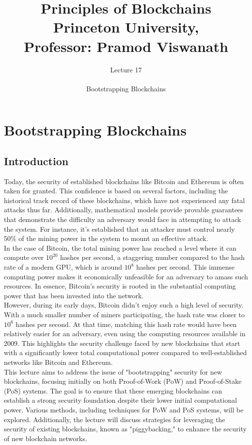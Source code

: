 \documentclass{report}
\title{\Huge{Principles of Blockchains \\ Princeton University,\\
		Professor: Pramod Viswanath}}
\author{\huge{Lecture 17} \\\\ Bootstrapping Blockchains}
\begin{document}
\maketitle
\newpage%
\tableofcontents
\pagebreak
  
\chapter{Bootstrapping Blockchains}
\section{Introduction}
Today, the security of established blockchains like Bitcoin and Ethereum is often taken for granted. This confidence is based on several factors, including the historical track record of these blockchains, which have not experienced any fatal attacks thus far. Additionally, mathematical models provide provable guarantees that demonstrate the difficulty an adversary would face in attempting to attack the system. For instance, it's established that an attacker must control nearly 50\% of the mining power in the system to mount an effective attack. \\
In the case of Bitcoin, the total mining power has reached a level where it can compute over $10^{20}$ hashes per second, a staggering number compared to the hash rate of a modern GPU, which is around $10^{8}$ hashes per second. This immense computing power makes it economically unfeasible for an adversary to amass such resources. In essence, Bitcoin's security is rooted in the substantial computing power that has been invested into the network.\\
However, during its early days, Bitcoin didn't enjoy such a high level of security. With a much smaller number of miners participating, the hash rate was closer to $10^{6}$ hashes per second. At that time, matching this hash rate would have been relatively easier for an adversary, even using the computing resources available in 2009. This highlights the security challenge faced by new blockchains that start with a significantly lower total computational power compared to well-established networks like Bitcoin and Ethereum.\\
This lecture aims to address the issue of "bootstrapping" security for new blockchains, focusing initially on both Proof-of-Work (PoW) and Proof-of-Stake (PoS) systems. The goal is to ensure that these emerging blockchains can establish a strong security foundation despite their lower initial computational power. Various methods, including techniques for PoW and PoS systems, will be explored. Additionally, the lecture will discuss strategies for leveraging the security of existing blockchains, known as "piggybacking," to enhance the security of new blockchain networks.
\end{document}
